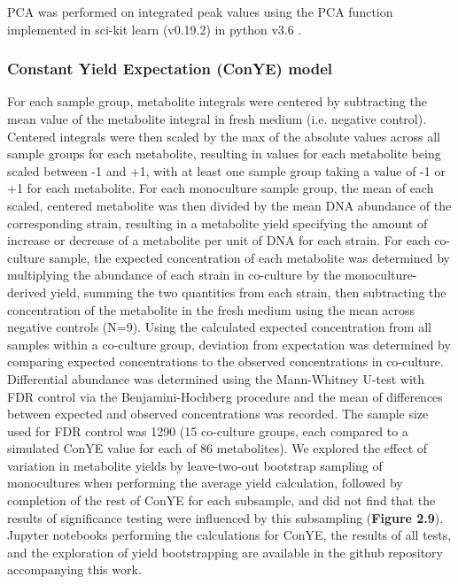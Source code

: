 \documentclass[11pt,twocolumn,notitlepage,openany,twoside]{book}
\begin{document}
\begin{refsection}
PCA was performed on integrated peak values using the PCA function implemented in sci-kit learn (v0.19.2) in python v3.6 \cite{Pedregosa2011-wa}.

\subsubsection{Constant Yield Expectation (ConYE) model}

For each sample group, metabolite integrals were centered by subtracting the mean value of the metabolite integral in fresh medium (i.e. negative control). Centered integrals were then scaled by the max of the absolute values across all sample groups for each metabolite, resulting in values for each metabolite being scaled between -1 and +1, with at least one sample group taking a value of -1 or +1 for each metabolite. For each monoculture sample group, the mean of each scaled, centered metabolite was then divided by the mean DNA abundance of the corresponding strain, resulting in a metabolite yield specifying the amount of increase or decrease of a metabolite per unit of DNA for each strain. For each co-culture sample, the expected concentration of each metabolite was determined by multiplying the abundance of each strain in co-culture by the monoculture-derived yield, summing the two quantities from each strain, then subtracting the concentration of the metabolite in the fresh medium using the mean across negative controls (N=9). Using the calculated expected concentration from all samples within a co-culture group, deviation from expectation was determined by comparing expected concentrations to the observed concentrations in co-culture. Differential abundance was determined using the Mann-Whitney U-test with FDR control via the Benjamini-Hochberg procedure \cite{Benjamini1995-nd} and the mean of differences between expected and observed concentrations was recorded. The sample size used for FDR control was 1290 (15 co-culture groups, each compared to a simulated ConYE value for each of 86 metabolites). We explored the effect of variation in metabolite yields by leave-two-out bootstrap sampling of monocultures when performing the average yield calculation, followed by completion of the rest of ConYE for each subsample, and did not find that the results of significance testing were influenced by this subsampling (\textbf{Figure 2.9}). Jupyter notebooks performing the calculations for ConYE, the results of all tests, and the exploration of yield bootstrapping are available in the github repository accompanying this work.


\end{refsection}
\end{document}
